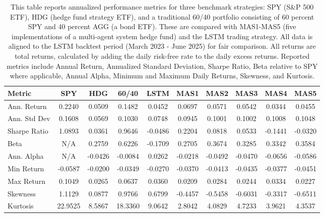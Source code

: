\begin{table}[htbp]
\centering
\begin{tabular}{lccccccccc}
\toprule
Metric & SPY & HDG & 60/40 & LSTM & MAS1 & MAS2 & MAS3 & MAS4 & MAS5 \\
\midrule
Ann. Return & 0.2240 & 0.0509 & 0.1482 & 0.0452 & 0.0697 & 0.0571 & 0.0542 & 0.0344 & 0.0455 \\
Ann. Std Dev & 0.1608 & 0.0569 & 0.1030 & 0.0748 & 0.0945 & 0.1001 & 0.1002 & 0.1008 & 0.1048 \\
Sharpe Ratio & 1.0893 & 0.0361 & 0.9646 & -0.0486 & 0.2204 & 0.0818 & 0.0533 & -0.1441 & -0.0320 \\
Beta & N/A & 0.2759 & 0.6226 & -0.1709 & 0.2705 & 0.3674 & 0.3285 & 0.3342 & 0.3584 \\
Ann. Alpha & N/A & -0.0426 & -0.0084 & 0.0262 & -0.0218 & -0.0492 & -0.0470 & -0.0656 & -0.0586 \\
Min Return & -0.0587 & -0.0200 & -0.0349 & -0.0270 & -0.0370 & -0.0413 & -0.0435 & -0.0377 & -0.0451 \\
Max Return & 0.1049 & 0.0265 & 0.0637 & 0.0360 & 0.0209 & 0.0284 & 0.0244 & 0.0334 & 0.0227 \\
Skewness & 1.1129 & 0.0877 & 0.9766 & 0.6799 & -0.4457 & -0.5458 & -0.6031 & -0.3317 & -0.6511 \\
Kurtosis & 22.9525 & 8.5867 & 18.3360 & 9.0642 & 2.8042 & 4.0829 & 4.7233 & 3.9621 & 4.3537 \\
\bottomrule
\end{tabular}
\caption[Performance Summary Statistics (LSTM Period)]{This table reports annualized performance metrics for three benchmark strategies: SPY (S\&P 500 ETF), HDG (hedge fund strategy ETF), and a traditional 60/40 portfolio consisting of 60 percent SPY and 40 percent AGG (a bond ETF). These are compared with MAS1-MAS5 (five implementations of a multi-agent system hedge fund) and the LSTM trading strategy. All data is aligned to the LSTM backtest period (March 2023 - June 2025) for fair comparison. All returns are total returns, calculated by adding the daily risk-free rate to the daily excess returns. Reported metrics include Annual Return, Annualized Standard Deviation, Sharpe Ratio, Beta relative to SPY where applicable, Annual Alpha, Minimum and Maximum Daily Returns, Skewness, and Kurtosis.}
\label{tab:performance_summary_lstm_aligned}
\end{table}